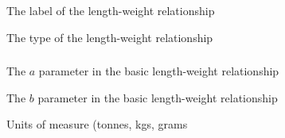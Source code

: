 
 {The label of the length-weight relationship}

 {The type of the length-weight relationship}

\subsubsection[Basic]{}

 {The $a$ parameter in the basic length-weight relationship}

 {The $b$ parameter in the basic length-weight relationship}

 {Units of measure (tonnes, kgs, grams}

\subsubsection[None]{}

